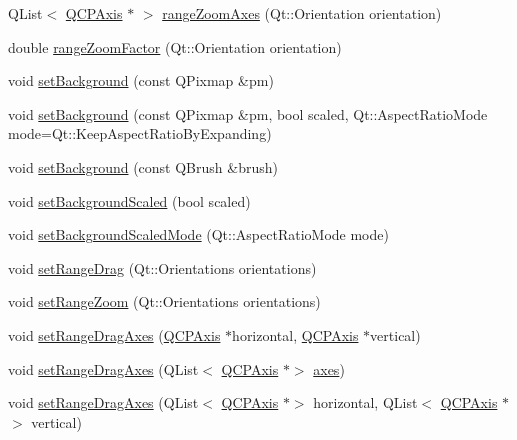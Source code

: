 \begin{DoxyCompactItemize}
\item 
Q\+List$<$ \mbox{\hyperlink{class_q_c_p_axis}{Q\+C\+P\+Axis}} $\ast$ $>$ \mbox{\hyperlink{class_q_c_p_axis_rect_a86aac0f435f209d60dacd22cda10c104}{range\+Zoom\+Axes}} (Qt\+::\+Orientation orientation)
\item 
double \mbox{\hyperlink{class_q_c_p_axis_rect_ae4e6c4d143aacc88d2d3c56f117c2fe1}{range\+Zoom\+Factor}} (Qt\+::\+Orientation orientation)
\item 
void \mbox{\hyperlink{class_q_c_p_axis_rect_af615ab5e52b8e0a9a0eff415b6559db5}{set\+Background}} (const Q\+Pixmap \&pm)
\item 
void \mbox{\hyperlink{class_q_c_p_axis_rect_ac48a2d5d9b7732e73b86605c69c5e4c1}{set\+Background}} (const Q\+Pixmap \&pm, bool scaled, Qt\+::\+Aspect\+Ratio\+Mode mode=Qt\+::\+Keep\+Aspect\+Ratio\+By\+Expanding)
\item 
void \mbox{\hyperlink{class_q_c_p_axis_rect_a22a22b8668735438dc06f9a55fe46b33}{set\+Background}} (const Q\+Brush \&brush)
\item 
void \mbox{\hyperlink{class_q_c_p_axis_rect_ae6d36c3e0e968ffb991170a018e7b503}{set\+Background\+Scaled}} (bool scaled)
\item 
void \mbox{\hyperlink{class_q_c_p_axis_rect_a5ef77ea829c9de7ba248e473f48f7305}{set\+Background\+Scaled\+Mode}} (Qt\+::\+Aspect\+Ratio\+Mode mode)
\item 
void \mbox{\hyperlink{class_q_c_p_axis_rect_ae6aef2f7211ba6097c925dcd26008418}{set\+Range\+Drag}} (Qt\+::\+Orientations orientations)
\item 
void \mbox{\hyperlink{class_q_c_p_axis_rect_a7960a9d222f1c31d558b064b60f86a31}{set\+Range\+Zoom}} (Qt\+::\+Orientations orientations)
\item 
void \mbox{\hyperlink{class_q_c_p_axis_rect_a648cce336bd99daac4a5ca3e5743775d}{set\+Range\+Drag\+Axes}} (\mbox{\hyperlink{class_q_c_p_axis}{Q\+C\+P\+Axis}} $\ast$horizontal, \mbox{\hyperlink{class_q_c_p_axis}{Q\+C\+P\+Axis}} $\ast$vertical)
\item 
void \mbox{\hyperlink{class_q_c_p_axis_rect_ab756bc5f129115fa3e8783617292fc1a}{set\+Range\+Drag\+Axes}} (Q\+List$<$ \mbox{\hyperlink{class_q_c_p_axis}{Q\+C\+P\+Axis}} $\ast$$>$ \mbox{\hyperlink{class_q_c_p_axis_rect_a8db4722cb93e9c4a6f0d91150c200867}{axes}})
\item 
void \mbox{\hyperlink{class_q_c_p_axis_rect_ab767e659f952fd7cbf61faaf33feefc5}{set\+Range\+Drag\+Axes}} (Q\+List$<$ \mbox{\hyperlink{class_q_c_p_axis}{Q\+C\+P\+Axis}} $\ast$$>$ horizontal, Q\+List$<$ \mbox{\hyperlink{class_q_c_p_axis}{Q\+C\+P\+Axis}} $\ast$$>$ vertical)
$$
\end{DoxyCompactItemize}
